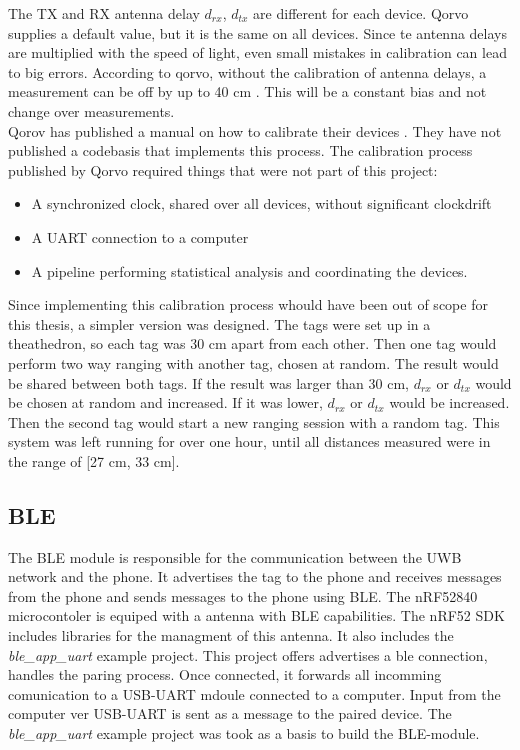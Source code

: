 The TX and RX antenna delay $d_{rx}$, $d_{tx}$ are different for each device.
Qorvo supplies a default value, but it is the same on all devices.
Since te antenna delays are multiplied with the speed of light, even small mistakes in calibration can lead to big errors.
According to qorvo, without the calibration of antenna delays, a measurement can be off by up to 40 cm \cite{DWM3000Calib}.
This will be a constant bias and not change over measurements.\\
Qorov has published a manual on how to calibrate their devices \cite{DWM3000Calib}.
They have not published a codebasis that implements this process.
The calibration process published by Qorvo required things that were not part of this project:
\begin{itemize}
	\item A synchronized clock, shared over all devices, without significant clockdrift
	\item A UART connection to a computer
	\item A pipeline performing statistical analysis and coordinating the devices.
\end{itemize} 
Since implementing this calibration process whould have been out of scope for this thesis, a simpler version was designed.
The tags were set up in a theathedron, so each tag was 30 cm apart from each other.
Then one tag would perform two way ranging with another tag, chosen at random.
The result would be shared between both tags.
If the result was larger than 30 cm, $d_{rx}$ or $d_{tx}$ would be chosen at random and increased.
If it was lower, $d_{rx}$ or $d_{tx}$ would be increased.
Then the second tag would start a new ranging session with a random tag.
This system was left running for over one hour, until all distances measured were in the range of [27 cm, 33 cm].


\subsection{BLE}
\label{ss:ble_module}
The BLE module is responsible for the communication between the UWB network and the phone.
It advertises the tag to the phone and receives messages from the phone and sends messages to the phone using BLE.
The nRF52840 microcontoler is equiped with a antenna with BLE capabilities.
The nRF52 SDK includes libraries for the managment of this antenna.
It also includes the \textit{ble{\_}app{\_}uart} example project.
This project offers advertises a ble connection, handles the paring process.
Once connected, it forwards all incomming comunication to a USB-UART mdoule connected to a computer.
Input from the computer ver USB-UART is sent as a message to the paired device.
The  \textit{ble{\_}app{\_}uart} example project was took as a basis to build the BLE-module.


